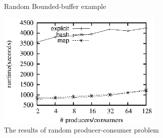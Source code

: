 \documentclass[preprint]{sigplanconf}
\begin{document}
\begin{figure}
  \centering
  \\
  \caption{Random Bounded-buffer example}
  \label{fig:rbb_exp}
\end{figure}
\begin{figure}[ht!]
  \centering
  \includegraphics[width=80mm]{fig/rpc.eps}
  \caption{The results of random producer-consumer problem}
  \label{fig:rpc_eval}
\end{figure}

%
\end{document}
